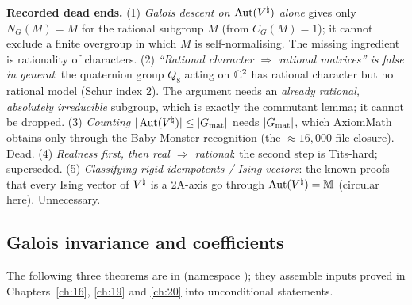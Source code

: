 \begin{warning}
\textbf{Recorded dead ends.}
(1) \emph{Galois descent on $\operatorname{Aut}({V^{\natural}})$ alone} gives only $N_G(M)=M$ for the rational subgroup $M$ (from $C_G(M)=1$); it
cannot exclude a finite overgroup in which $M$ is self-normalising.  The missing ingredient is rationality of characters.
(2) \emph{``Rational character $\Rightarrow$ rational matrices'' is false in general}: the quaternion group $Q_8$ acting on
${\mathbb{C}}^2$ has rational character but no rational model (Schur index $2$).  The argument needs an \emph{already rational,
absolutely irreducible} subgroup, which is exactly the commutant lemma; it cannot be dropped.
(3) \emph{Counting} $|\operatorname{Aut}({V^{\natural}})|\le|G_{\mathrm{mat}}|$ needs $|G_{\mathrm{mat}}|$, which AxiomMath obtains only through the
Baby Monster recognition (the $\approx16{,}000$-file closure).  Dead.
(4) \emph{Realness first, then real $\Rightarrow$ rational}: the second step is Tits-hard; superseded.
(5) \emph{Classifying rigid idempotents / Ising vectors}: the known proofs that every Ising vector of ${V^{\natural}}$ is a 2A-axis go
through $\operatorname{Aut}({V^{\natural}})=\mathbb{M}$ (circular here).  Unnecessary.
\end{warning}

\subsection{Galois invariance and coefficients}

The following three theorems are in  (namespace
); they assemble inputs proved in Chapters~\ref{ch:16}, \ref{ch:19} and \ref{ch:20}
into unconditional statements.

